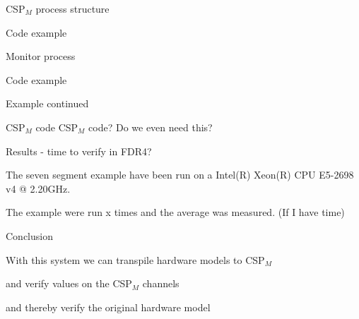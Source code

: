 \documentclass[13pt]{beamer}
\newcommand{\cspm}{CSP$_M$}
\begin{document}
%
\begin{frame}{\cspm{} process structure}
 \begin{block}{}
   Code example
 \end{block}

\end{frame}
%
\begin{frame}{Monitor process}
 \begin{block}{}
   Code example
 \end{block}

\end{frame}
%
\begin{frame}{Example continued}
 \begin{block}{\cspm{} code}
  \cspm{} code?
  Do we even need this?
 \end{block}
\end{frame}
%
\begin{frame}{Results - time to verify in FDR4?}
 \begin{block}{}
     The seven segment example have been run on a Intel(R) Xeon(R) CPU E5-2698 v4 @ 2.20GHz.

     \vspace{5mm}

   The example were run x times and the average was measured. (If I have time)
 \end{block}
\end{frame}
%
\begin{frame}{Conclusion}
 \begin{block}{}
  With this system we can transpile hardware models to \cspm{}
 \end{block}

 \pause

 \begin{block}{}
  and verify values on the \cspm{} channels
 \end{block}

 \pause

 \begin{block}{}
  and thereby verify the original hardware model
 \end{block}

\end{frame}
\end{document}
